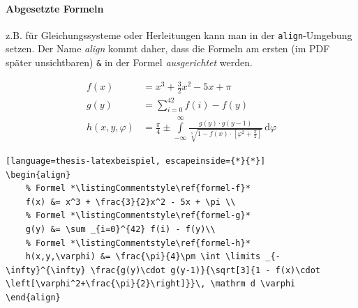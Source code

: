 			\paragraph{Abgesetzte Formeln}
				z.B. für Gleichungssysteme oder Herleitungen kann man in der \lstinline|align|-Umgebung setzen. 
				Der Name \emph{align} kommt daher, dass die Formeln am ersten (im PDF später unsichtbaren) \lstinline|&| in der Formel \emph{ausgerichtet} werden.
				\begin{vorlagenbeispiel}
					\begin{align}
						f(x)           &= x^3 + \frac{3}{2}x^2 - 5x + \pi\label{formel-f}\\
						g(y)           &= \sum_{i=0}^{42} f(i) - f(y)\label{formel-g}\\
						h(x,y,\varphi) &= \frac{\pi}{4}\pm \int \limits_{-\infty}^{\infty} \frac{g(y)\cdot g(y-1)}{\sqrt[3]{1 - f(x)\cdot \left[\varphi^2+\frac{\pi}{2}\right]}}\, \mathrm d \varphi\label{formel-h}
					\end{align}
				\end{vorlagenbeispiel}
				\begin{lstlisting}[language=thesis-latexbeispiel, escapeinside={*}{*}]
\begin{align}
	% Formel *\listingCommentstyle\ref{formel-f}*
	f(x) &= x^3 + \frac{3}{2}x^2 - 5x + \pi \\
	% Formel *\listingCommentstyle\ref{formel-g}*
	g(y) &= \sum _{i=0}^{42} f(i) - f(y)\\
	% Formel *\listingCommentstyle\ref{formel-h}*
	h(x,y,\varphi) &= \frac{\pi}{4}\pm \int \limits _{-\infty}^{\infty} \frac{g(y)\cdot g(y-1)}{\sqrt[3]{1 - f(x)\cdot \left[\varphi^2+\frac{\pi}{2}\right]}}\, \mathrm d \varphi
\end{align}
				\end{lstlisting}
				
		\clearpage
